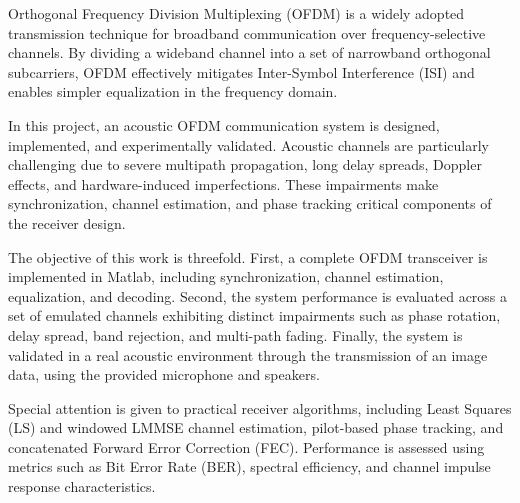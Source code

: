  \label{ch:Introduction}

\vspace{2ex}

Orthogonal Frequency Division Multiplexing (OFDM) is a widely adopted transmission technique
for broadband communication over frequency-selective channels. By dividing a wideband
channel into a set of narrowband orthogonal subcarriers, OFDM effectively mitigates
Inter-Symbol Interference (ISI) and enables simpler equalization in the frequency
domain.

In this project, an acoustic OFDM communication system is designed, implemented, and
experimentally validated. Acoustic channels are particularly challenging due to severe
multipath propagation, long delay spreads, Doppler effects, and hardware-induced
imperfections. These impairments make synchronization, channel estimation, and phase
tracking critical components of the receiver design.

The objective of this work is threefold. First, a complete OFDM transceiver is implemented
in Matlab, including synchronization, channel estimation, equalization, and decoding.
Second, the system performance is evaluated across a set of emulated channels exhibiting
distinct impairments such as phase rotation, delay spread, band rejection, and multi-path
fading. Finally, the system is validated in a real acoustic environment through the
transmission of an image data, using the provided microphone and speakers.

Special attention is given to practical receiver algorithms, including Least Squares (LS)
and windowed LMMSE channel estimation, pilot-based phase tracking, and concatenated
Forward Error Correction (FEC). Performance is assessed using metrics such as Bit Error
Rate (BER), spectral efficiency, and channel impulse response characteristics.